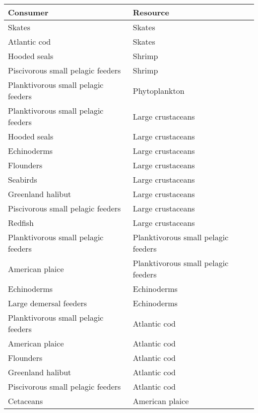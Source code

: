 \documentclass[letterpaper]{article}
\begin{document}
\begin{table}[h!]
    \centering
    \begin{tabular}{|l|l|}
      \hline
        Consumer               & Resource \\
      \hline    \hline
      Skates                              & Skates    \\
      Atlantic cod                        & Skates    \\
      Hooded seals                        & Shrimp    \\
      Piscivorous small pelagic feeders   & Shrimp    \\
      Planktivorous small pelagic feeders & Phytoplankton \\
      Planktivorous small pelagic feeders & Large crustaceans \\
      Hooded seals                        & Large crustaceans \\
      Echinoderms                         & Large crustaceans \\
      Flounders                           & Large crustaceans \\
      Seabirds                            & Large crustaceans \\
      Greenland halibut                   & Large crustaceans \\
      Piscivorous small pelagic feeders   & Large crustaceans \\
      Redfish                             & Large crustaceans \\
      Planktivorous small pelagic feeders & Planktivorous small pelagic feeders   \\
      American plaice                     & Planktivorous small pelagic feeders   \\
      Echinoderms                         & Echinoderms   \\
      Large demersal feeders              & Echinoderms   \\
      Planktivorous small pelagic feeders & Atlantic cod  \\
      American plaice                     & Atlantic cod  \\
      Flounders                           & Atlantic cod  \\
      Greenland halibut                   & Atlantic cod  \\
      Piscivorous small pelagic feeders   & Atlantic cod  \\
      Cetaceans                           & American plaice   \\

\end{tabular}
\end{table}
\end{document}
